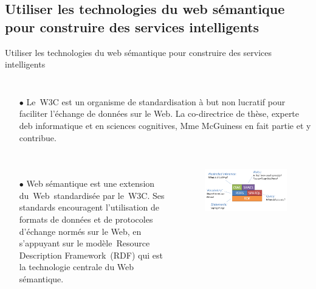 \documentclass[xcolor=dvipsnames]{beamer}
\begin{document}
\subsection{Utiliser les technologies du web sémantique pour construire des services intelligents}
\begin{frame}{Utiliser les technologies du web sémantique pour construire des services intelligents}
\begin{columns}
	\begin{itemize}
	\item[$\bullet$]Le W3C est un organisme de standardisation à but non lucratif pour faciliter l’échange de données sur le Web. La co-directrice de thèse, experte deb informatique et en sciences cognitives, Mme McGuiness en fait partie et y contribue.
	\end{itemize}
\end{columns}
	\begin{columns}
	\begin{itemize}
		\item[$\bullet$]Web sémantique est une extension du Web standardisée par le W3C. Ses standards encouragent l'utilisation de formats de données et de protocoles d'échange normés sur le Web, en s'appuyant sur le modèle Resource Description Framework (RDF) qui est la technologie centrale du Web sémantique. 
	\end{itemize}
	\begin{figure}[ht]
		\begin{center}
			\includegraphics[width=\textwidth]{./images/Semantic_Web.png}
		\end{center}
	\end{figure}
\end{columns}
\end{frame}
\end{document}
